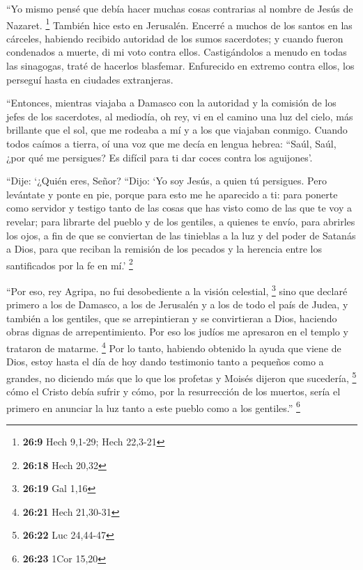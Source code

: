 \begin{paracol}{2}
 ``Yo mismo pensé que debía hacer muchas cosas contrarias
al nombre de Jesús de Nazaret. \footnote{\textbf{26:9} Hech 9,1-29; Hech
  22,3-21}  También hice esto en Jerusalén. Encerré a
muchos de los santos en las cárceles, habiendo recibido autoridad de los
sumos sacerdotes; y cuando fueron condenados a muerte, di mi voto contra
ellos.  Castigándolos a menudo en todas las sinagogas,
traté de hacerlos blasfemar. Enfurecido en extremo contra ellos, los
perseguí hasta en ciudades extranjeras.

 ``Entonces, mientras viajaba a Damasco con la autoridad
y la comisión de los jefes de los sacerdotes,  al
mediodía, oh rey, vi en el camino una luz del cielo, más brillante que
el sol, que me rodeaba a mí y a los que viajaban conmigo.
 Cuando todos caímos a tierra, oí una voz que me decía en
lengua hebrea: ``Saúl, Saúl, ¿por qué me persigues? Es difícil para ti
dar coces contra los aguijones'.

 ``Dije: `¿Quién eres, Señor? ``Dijo: `Yo soy Jesús, a
quien tú persigues.  Pero levántate y ponte en pie,
porque para esto me he aparecido a ti: para ponerte como servidor y
testigo tanto de las cosas que has visto como de las que te voy a
revelar;  para librarte del pueblo y de los gentiles, a
quienes te envío,  para abrirles los ojos, a fin de que
se conviertan de las tinieblas a la luz y del poder de Satanás a Dios,
para que reciban la remisión de los pecados y la herencia entre los
santificados por la fe en mí.' \footnote{\textbf{26:18} Hech 20,32}

 ``Por eso, rey Agripa, no fui desobediente a la visión
celestial, \footnote{\textbf{26:19} Gal 1,16}  sino que
declaré primero a los de Damasco, a los de Jerusalén y a los de todo el
país de Judea, y también a los gentiles, que se arrepintieran y se
convirtieran a Dios, haciendo obras dignas de arrepentimiento.
 Por eso los judíos me apresaron en el templo y trataron
de matarme. \footnote{\textbf{26:21} Hech 21,30-31}  Por
lo tanto, habiendo obtenido la ayuda que viene de Dios, estoy hasta el
día de hoy dando testimonio tanto a pequeños como a grandes, no diciendo
más que lo que los profetas y Moisés dijeron que sucedería, \footnote{\textbf{26:22}
  Luc 24,44-47}  cómo el Cristo debía sufrir y cómo, por
la resurrección de los muertos, sería el primero en anunciar la luz
tanto a este pueblo como a los gentiles.'' \footnote{\textbf{26:23} 1Cor
  15,20}


\end{paracol}
